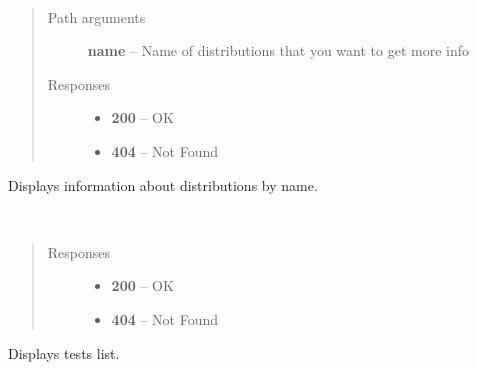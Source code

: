 \documentclass[letterpaper,10pt,english]{sphinxmanual}
\begin{document}
\begin{fulllineitems}
\label{01_how_to_use_it:method-get-distributions-name-}~\begin{quote}\begin{description}
\item[{Path arguments}] \leavevmode
\textbf{name} -- Name of distributions that you want to get more info

\item[{Responses}] \leavevmode\begin{itemize}
\item {} 
\textbf{200} -- OK

\item {} 
\textbf{404} -- Not Found

\end{itemize}

\end{description}\end{quote}

Displays information about distributions by name.

\end{fulllineitems}


\begin{fulllineitems}
\label{01_how_to_use_it:method-get-tests}~\begin{quote}\begin{description}
\item[{Responses}] \leavevmode\begin{itemize}
\item {} 
\textbf{200} -- OK

\item {} 
\textbf{404} -- Not Found

\end{itemize}

\end{description}\end{quote}

Displays tests list.

\end{fulllineitems}

\end{document}
